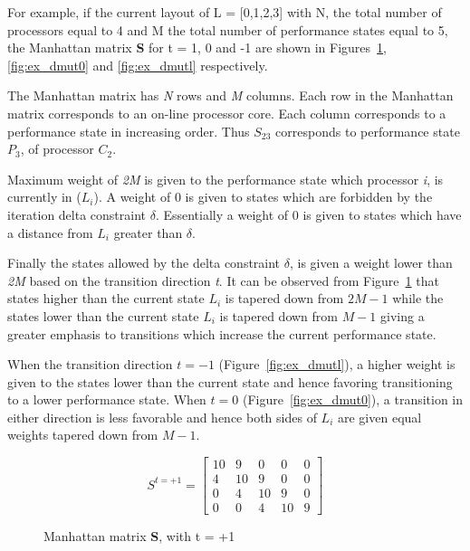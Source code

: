For example, if the current layout of L = [0,1,2,3] with N, the total number of processors equal to 4 
and M the total number of performance states equal to 5,
the Manhattan matrix \textbf{S} for t = 1, 0 and -1 are shown in Figures~\ref{fig:ex_dmuth}, 
\ref{fig:ex_dmut0} and \ref{fig:ex_dmutl} respectively. 

The Manhattan matrix has \textit{N} rows and \textit{M} columns. Each row in the Manhattan
matrix corresponds to an on-line processor core. Each column corresponds to a performance state
in increasing order. Thus $S_{23}$ corresponds to performance state $P_3$, of processor $C_2$. 

Maximum weight of \textit{2M} is given
to the performance state which processor \textit{i}, is currently in ($L_{i}$).
A weight of 0 is given to states which are forbidden by the iteration delta constraint $\delta$. 
Essentially a weight of 0 is given to states which have a distance from $L_{i}$ greater than $\delta$.

Finally the states allowed by the delta constraint $\delta$, is given a weight lower than
\textit{2M} based on the transition direction \textit{t}. It can be observed from Figure~\ref{fig:ex_dmuth} 
that states higher than the current state $L_{i}$ is tapered down from $2M-1$ while the states
lower than the current state $L_{i}$ is tapered down from $M-1$ giving a greater emphasis to transitions 
which increase the current performance state.

When the transition direction $t = -1$ (Figure~\ref{fig:ex_dmutl}), 
a higher weight is given to the states lower than the current state and hence favoring 
transitioning to a lower performance state. When $t = 0$ (Figure~\ref{fig:ex_dmut0}), 
a transition in either direction is less favorable and hence both sides of $L_{i}$ 
are given equal weights tapered down from $M-1$.


\begin{figure}[h!]
\centering
\begin{equation*}
    S^{t = +1} = \left[
     \begin{array}{ccccc}
       10 & 9 & 0 & 0 & 0 \\
       4 & 10 & 9 & 0 & 0 \\
       0 & 4 & 10 & 9 & 0 \\
       0 & 0 & 4 & 10 & 9
     \end{array}
   \right]
\end{equation*}
\caption{Manhattan matrix \textbf{S}, with t = +1}
\label{fig:ex_dmuth}
\end{figure}

